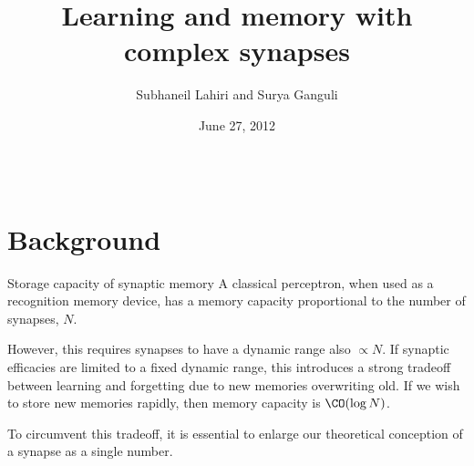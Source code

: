 \documentclass[final,hyperref={pdfpagelabels=false,bookmarks=false}]{beamer}
\title{Learning and memory with complex synapses}
\author{Subhaneil Lahiri and Surya Ganguli}
\institute[Stanford]{%
Department of Applied Physics, Stanford University, Stanford CA
}
\date{June 27, 2012}
\newcommand{\citerr}[1]{\hfill {\footnotesize{\color{darkgrey}\cite{#1}}}}
\begin{document}
\begin{frame}{}

\begin{columns}[t]


\begin{column}{0.27\linewidth}

\section{Background}


\begin{block}{Storage capacity of synaptic memory}
%
%
 A classical perceptron, when used as a recognition memory device, has a memory capacity proportional to the number of synapses, $N$.

 \vp However, this requires synapses to have a dynamic range also $\propto N$.
 If synaptic efficacies are limited to a fixed dynamic range, this introduces a strong tradeoff between learning and forgetting due to new memories overwriting old.
 If we wish to store new memories rapidly, then memory capacity is $\CO(\log N)$.
 \\ \citerr{amit1992constraints,amit1994learning}

 \vp To circumvent this tradeoff, it is essential to enlarge our theoretical conception of a synapse as a single number.
\end{block}



\end{column}
\end{columns}
\end{frame}
\end{document}
